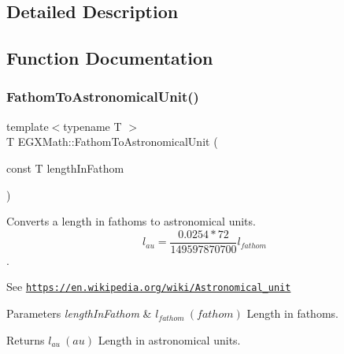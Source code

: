 \subsection{Detailed Description}


\subsection{Function Documentation}
\mbox{\label{group___e_g_x_math-_conversions-_length_conversions-_nautical-_fathom-_astronomical_gaf453178809cd1255a67509e03dc55f6b}} 
\subsubsection{\texorpdfstring{Fathom\+To\+Astronomical\+Unit()}{FathomToAstronomicalUnit()}}
{\footnotesize\ttfamily template$<$typename T $>$ \\
T E\+G\+X\+Math\+::\+Fathom\+To\+Astronomical\+Unit (\begin{DoxyParamCaption}\item[{const T}]{length\+In\+Fathom }\end{DoxyParamCaption})}



Converts a length in fathoms to astronomical units. \[ l_{au}=\frac{0.0254 * 72}{149597870700} l_{fathom} \]. 

See \href{https://en.wikipedia.org/wiki/Astronomical_unit}{\tt https\+://en.\+wikipedia.\+org/wiki/\+Astronomical\+\_\+unit} 
\begin{DoxyParams}{Parameters}
{\em length\+In\+Fathom} & $ l_{fathom}\ (fathom)$ Length in fathoms. \\
\hline
\end{DoxyParams}
\begin{DoxyReturn}{Returns}
$ l_{au}\ (au)$ Length in astronomical units. 
\end{DoxyReturn}
\mbox{\label{group___e_g_x_math-_conversions-_length_conversions-_nautical-_fathom-_astronomical_gaa45a6119423d8aa6928dd9da3fe553e6}} 
